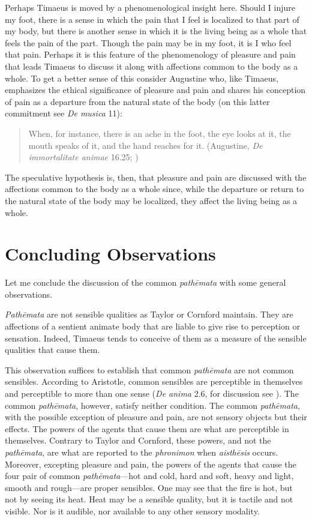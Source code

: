 Perhaps Timaeus is moved by a phenomenological insight here. Should I injure my foot, there is a sense in which the pain that I feel is localized to that part of my body, but there is another sense in which it is the living being as a whole that feels the pain of the part. Though the pain may be in my foot, it is I who feel that pain. Perhaps it is this feature of the phenomenology of pleasure and pain that leads Timaeus to discuss it along with affections common to the body as a whole. To get a better sense of this consider Augustine who, like Timaeus, emphasizes the ethical significance of pleasure and pain and shares his conception of pain as a departure from the natural state of the body (on this latter commitment see \emph{De musica} 11):
\begin{quote}
	When, for instance, there is an ache in the foot, the eye looks at it, the mouth speaks of it, and the hand reaches for it. (Augustine, \emph{De immortalitate animae} 16.25; \citealt[46]{Schopp:1947df})
\end{quote}
The speculative hypothesis is, then, that pleasure and pain are discussed with the affections common to the body as a whole since, while the departure or return to the natural state of the body may be localized, they affect the living being as a whole.


\section{Concluding Observations} %
\label{sec:concluding_observations}

Let me conclude the discussion of the common \emph{pathēmata} with some general observations. 

\emph{Pathēmata} are not sensible qualities as Taylor or Cornford maintain. They are affections of a sentient animate body that are liable to give rise to perception or sensation. Indeed, Timaeus tends to conceive of them as a measure of the sensible qualities that cause them.

This observation suffices to establish that common \emph{pathēmata} are not common sensibles. According to Aristotle, common sensibles are perceptible in themselves and perceptible to more than one sense (\emph{De anima} 2.6, for discussion see \citealt[chapter 4.2]{Kalderon:2015fr}). The common \emph{pathēmata}, however, satisfy neither condition. The common \emph{pathēmata}, with the possible exception of pleasure and pain, are not sensory objects but their effects. The powers of the agents that cause them are what are perceptible in themselves. Contrary to Taylor and Cornford, these powers, and not the \emph{pathēmata}, are what are reported to the \emph{phronimon} when \emph{aisthēsis} occurs. Moreover, excepting pleasure and pain, the powers of the agents that cause the four pair of common \emph{pathēmata}---hot and cold, hard and soft, heavy and light, smooth and rough---are proper sensibles. One may see that the fire is hot, but not by seeing its heat. Heat may be a sensible quality, but it is tactile and not visible. Nor is it audible, nor available to any other sensory modality.

